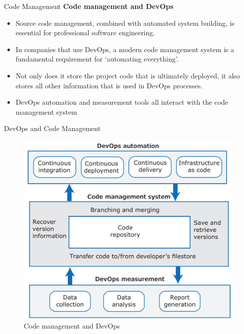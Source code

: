 \documentclass{beamer}
\begin{document}
\begin{frame}{Code Management}
	\textbf{Code management and DevOps }
	\begin{itemize}
		\item Source code management, combined with automated system building, is essential for professional software engineering. 
		\item In companies that use DevOps, a modern code management system is a fundamental requirement for ‘automating everything’. 
		\item Not only does it store the project code that is ultimately deployed, it also stores all other information that is used in DevOps processes. 
		\item DevOps automation and measurement tools all interact with the code management system
	\end{itemize}
\end{frame}
\begin{frame}{DevOps and Code Management}
	\begin{figure}
		\includegraphics[scale=.4]{img/m3_38}
		\caption{Code management and DevOps}
	\end{figure}
\end{frame}
\end{document}
